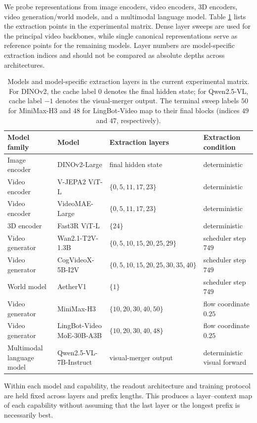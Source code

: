 We probe representations from image encoders, video encoders, 3D encoders,
video generation/world models, and a multimodal language model. Table
\ref{tab:model-layer-grid} lists the extraction points in the experimental
matrix. Dense layer sweeps are used for the principal video backbones, while
single canonical representations serve as reference points for the remaining
models. Layer numbers are model-specific extraction indices and should not be
compared as absolute depths across architectures.

\begin{table}[t]
  \centering
  \small
  \setlength{\tabcolsep}{5pt}
  \begin{tabular}{p{}p{}p{}p{}}
    \toprule
    \textbf{Model family} & \textbf{Model} & \textbf{Extraction layers} &
    \textbf{Extraction condition} \\
    \midrule
    Image encoder
      & DINOv2-Large
      & final hidden state
      & deterministic \\
    Video encoder
      & V-JEPA2 ViT-L
      & $\{0,5,11,17,23\}$
      & deterministic \\
    Video encoder
      & VideoMAE-Large
      & $\{0,5,11,17,23\}$
      & deterministic \\
    3D encoder
      & Fast3R ViT-L
      & $\{24\}$
      & deterministic \\
    Video generator
      & Wan2.1-T2V-1.3B
      & $\{0,5,10,15,20,25,29\}$
      & scheduler step $749$ \\
    Video generator
      & CogVideoX-5B-I2V
      & $\{0,5,10,15,20,25,30,35,40\}$
      & scheduler step $749$ \\
    World model
      & AetherV1
      & $\{1\}$
      & scheduler step $749$ \\
    Video generator
      & MiniMax-H3
      & $\{10,20,30,40,50\}$
      & flow coordinate $0.25$ \\
    Video generator
      & LingBot-Video MoE-30B-A3B
      & $\{10,20,30,40,48\}$
      & flow coordinate $0.25$ \\
    Multimodal language model
      & Qwen2.5-VL-7B-Instruct
      & visual-merger output
      & deterministic visual forward \\
    \bottomrule
  \end{tabular}
  \caption{Models and model-specific extraction layers in the current
  experimental matrix. For DINOv2, the cache label $0$ denotes the final
  hidden state; for Qwen2.5-VL, cache label $-1$ denotes the visual-merger
  output. The terminal sweep labels $50$ for MiniMax-H3 and $48$ for
  LingBot-Video map to their final blocks (indices $49$ and $47$,
  respectively).}
  \label{tab:model-layer-grid}
\end{table}

Within each model and capability, the readout architecture and training
protocol are held fixed across layers and prefix lengths. This produces a
layer--context map of each capability without assuming that the last layer or
the longest prefix is necessarily best.
